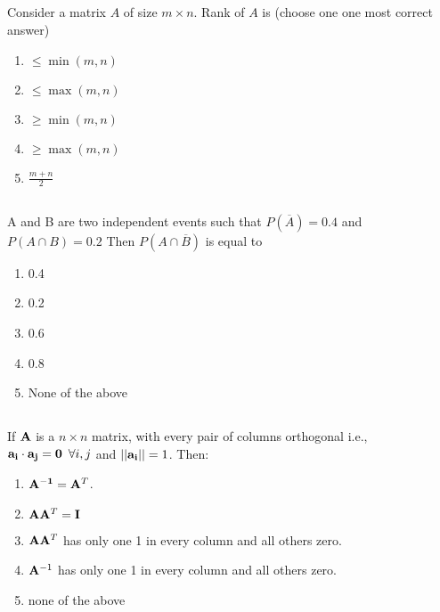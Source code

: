\begin{frame}
\section{}
  Consider a matrix $A$ of size $m\times n$. Rank of $A$ is
  (choose one one most correct answer)
    \begin{enumerate}[label=(\Alph*)]
    \item $\leq \min(m,n)$
    \item $\leq \max (m,n)$
    \item $\geq \min(m,n)$
    \item $\geq \max(m,n)$
    \item $\frac{m+n}{2}$
    \end{enumerate}
\end{frame}

\begin{frame}
\section{}
  A and B are two independent events such that $P(\overline A) =0.4$ and $P(A \cap B) = 0.2$ Then $P(A \cap \overline B)$ is equal to
     \begin{enumerate}[label=(\Alph*)]
         \item 0.4 %
         \item 0.2
         \item 0.6
         \item 0.8
         \item None of  the above
     \end{enumerate}
\end{frame}

\begin{frame}
\section{}
  If ${\bf A}$ is a $n\times n$ matrix, with every pair of columns
  orthogonal i.e., ${\bf a_i\cdot a_j = 0}\,\,\, \forall i,j$ and $||{\bf a_i}|| = 1$. Then:
    \begin{enumerate}[label=(\Alph*)]
         \item ${\bf A^{-1}} = {\bf A}^T$.
         \item ${\bf A}{\bf A}^T = {\bf I}$
         \item ${\bf A}{\bf A}^T$ has only one 1 in every column and all others zero.
         \item ${\bf A}^{-1}$ has only one 1 in every column and all others zero.
         \item none of the above
    \end{enumerate}
\end{frame}

